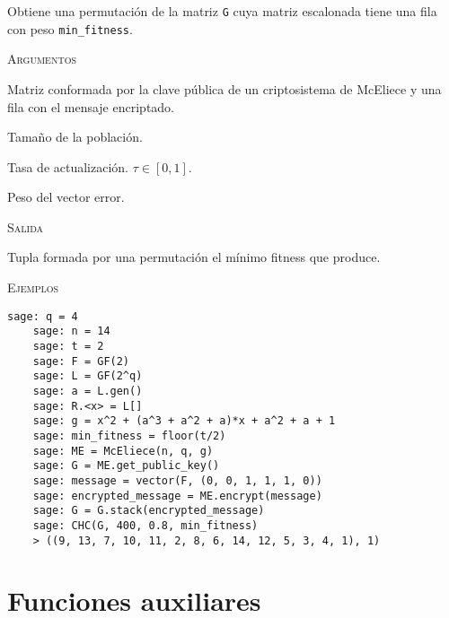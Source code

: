 \begin{description}[leftmargin=1em, font=\normalfont\ttfamily, style=nextline]
  \item[CHC(G, N, tau, min\_fitness)] Obtiene una permutación de la matriz \texttt{G} cuya matriz escalonada tiene una fila con peso \texttt{min\_fitness}.

  \textsc{Argumentos}
  \begin{description}[font=\normalfont\ttfamily]
    \item[G] Matriz conformada por la clave pública de un criptosistema de McEliece y una fila con el mensaje encriptado.
    \item[N] Tamaño de la población.
    \item[tau] Tasa de actualización. $\tau \in [0,1]$.
    \item[min\_fitness] Peso del vector error. 
  \end{description}

  \textsc{Salida}
  \begin{description}[font=\normalfont\ttfamily]
    \item[] Tupla formada por una permutación el mínimo fitness que produce.
  \end{description}

  \textsc{Ejemplos}
  \begin{lstlisting}[gobble=4]
    sage: q = 4
    sage: n = 14
    sage: t = 2
    sage: F = GF(2)
    sage: L = GF(2^q)
    sage: a = L.gen()
    sage: R.<x> = L[]
    sage: g = x^2 + (a^3 + a^2 + a)*x + a^2 + a + 1
    sage: min_fitness = floor(t/2)
    sage: ME = McEliece(n, q, g)
    sage: G = ME.get_public_key()
    sage: message = vector(F, (0, 0, 1, 1, 1, 0))
    sage: encrypted_message = ME.encrypt(message)
    sage: G = G.stack(encrypted_message)
    sage: CHC(G, 400, 0.8, min_fitness)
    > ((9, 13, 7, 10, 11, 2, 8, 6, 14, 12, 5, 3, 4, 1), 1)
  \end{lstlisting}
\end{description}

\section{Funciones auxiliares}

